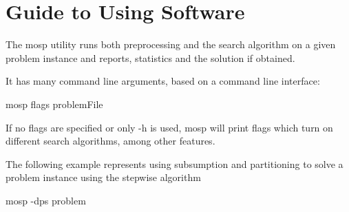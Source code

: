 \section{Guide to Using Software}

The mosp utility runs both preprocessing and the search algorithm on a given
problem instance and reports, statistics and the solution if obtained.

It has many command line arguments, based on a command line interface:

mosp flags problemFile

If no flags are specified or only -h is used, mosp will print flags which turn
on different search algorithms, among other features.

The following example represents using subsumption and partitioning to solve a
problem instance using the stepwise algorithm

mosp -dps problem
